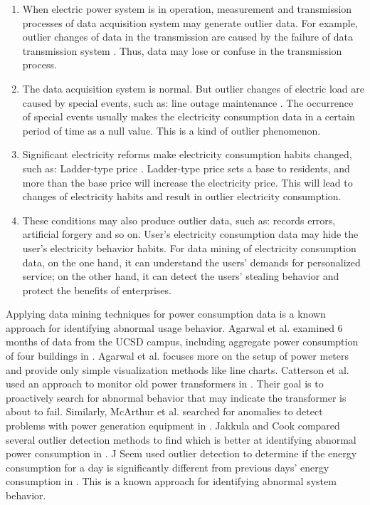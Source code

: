 \begin{enumerate}
 \item
When electric power system is in operation, measurement and transmission processes of data acquisition system may generate outlier data. For example, outlier changes of data in the transmission are caused by the failure of data transmission system \cite{xu2014application}. Thus, data may lose or confuse in the transmission process.
 \item
The data acquisition system is normal. But outlier changes of electric load are caused by special events, such as: line outage maintenance \cite{dasu1999hunting}. The occurrence of special events usually makes the electricity consumption data in a certain period of time as a null value. This is a kind of outlier phenomenon.
 \item
Significant electricity reforms make electricity consumption habits changed, such as: Ladder-type price \cite{yu2011detecting}. Ladder-type price sets a base to residents, and more than the base price will increase the electricity price. This will lead to changes of electricity habits and result in outlier electricity consumption.
 \item
These conditions may also produce outlier data, such as: records errors, artificial forgery and so on. User's electricity consumption data may hide the user's electricity behavior habits. For data mining of electricity consumption data, on the one hand, it can understand the users’ demands for personalized service; on the other hand, it can detect the users’ stealing behavior and protect the benefits of enterprises.
\end{enumerate}
\frenchspacing 
Applying data mining techniques for power consumption data is a known approach for identifying abnormal usage behavior. Agarwal et al. examined 6 months of data from the UCSD campus, including aggregate power consumption of four buildings in \cite{agarwal2009energy}. Agarwal et al. focuses more on the setup of power meters and provide only simple visualization methods like line charts. Catterson et al. used an approach to monitor old power transformers in \cite{catterson2010online}. Their goal is to proactively search for abnormal behavior that may indicate the transformer is about to fail. Similarly, McArthur et al. searched for anomalies to detect problems with power generation equipment in \cite{mcarthur2005agent}. Jakkula and Cook compared several outlier detection methods to find which is better at identifying abnormal power consumption in \cite{jakkula2010outlier}. J Seem used outlier detection to determine if the energy consumption for a day is significantly different from previous days’ energy consumption in \cite{seem2007using}. This is a known approach for identifying abnormal system behavior.

